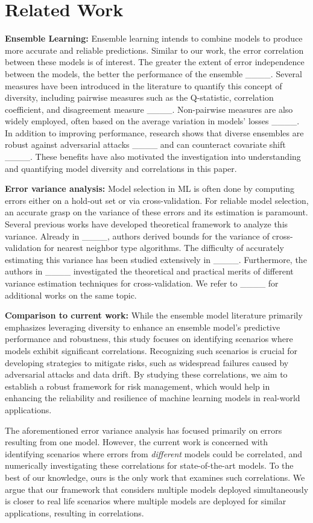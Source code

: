 \section{Related Work}
\textbf{Ensemble Learning:} 
Ensemble learning intends to combine models to produce more accurate and reliable predictions. Similar to our work, the error correlation between these models is of interest. The greater the extent of error independence between the models, the better the performance of the ensemble ____. Several measures have been introduced in the literature to quantify this concept of diversity, including pairwise measures such as the Q-statistic, correlation coefficient, and disagreement measure ____. Non-pairwise measures are also widely employed, often based on the average variation in models' losses ____. In addition to improving performance, research shows that diverse ensembles are robust against adversarial attacks ____ and can counteract covariate shift ____. These benefits have also motivated the investigation into understanding and quantifying model diversity and correlations in this paper. 

\textbf{Error variance analysis:} Model selection in ML is often done by computing errors either on a hold-out set or via cross-validation. For reliable model selection, an accurate grasp on the variance of these errors and its estimation is paramount. Several previous works have developed theoretical framework to analyze this variance. Already in ____, authors derived bounds for the variance of cross-validation for nearest neighbor type algorithms. The difficulty of accurately estimating this variance has been studied extensively in ____. Furthermore, the authors in ____ investigated the theoretical and practical merits of different variance estimation techniques for cross-validation. We refer to ____ for additional works on the same topic.

\textbf{Comparison to current work:} While the ensemble model literature primarily emphasizes leveraging diversity to enhance an ensemble model's predictive performance and robustness, this study focuses on identifying scenarios where models exhibit significant correlations. Recognizing such scenarios is crucial for developing strategies to mitigate risks, such as widespread failures caused by adversarial attacks and data drift. By studying these correlations, we aim to establish a robust framework for risk management, which would help in enhancing the reliability and resilience of machine learning models in real-world applications.

The aforementioned error variance analysis has focused primarily on errors resulting from one model. However, the current work is concerned with identifying scenarios where errors from \textit{different} models could be correlated, and numerically investigating these correlations for state-of-the-art models. To the best of our knowledge, ours is the only work that examines such correlations. We argue that our framework that considers multiple models deployed simultaneously is closer to real life scenarios where multiple models are deployed for similar applications, resulting in correlations.